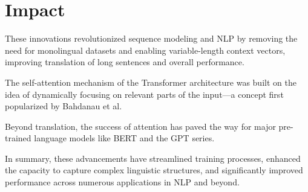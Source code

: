 \documentclass[10pt]{article}
\begin{document}
\section*{Impact}
These innovations revolutionized sequence modeling and NLP by removing the need for monolingual datasets and enabling variable-length context vectors, improving translation of long sentences and overall performance.

The self-attention mechanism of the Transformer architecture \cite{DBLP:journals/corr/VaswaniSPUJGKP17} was built on the idea of dynamically focusing on relevant parts of the input—a concept first popularized by Bahdanau et al.\cite{bahdanau2016}

Beyond translation, the success of attention has paved the way for major pre-trained language models like BERT\cite{DBLP:journals/corr/abs-1810-04805} and the GPT series\cite{radford2018improving}.

In summary, these advancements have streamlined training processes, enhanced the capacity to capture complex linguistic structures, and significantly improved performance across numerous applications in NLP and beyond.




\end{document}
